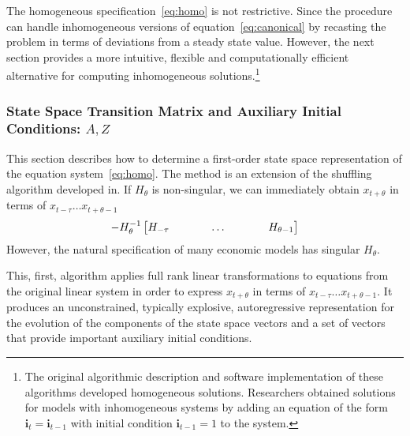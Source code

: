 \documentclass{elsart}
\begin{document}
The homogeneous specification~\ref{eq:homo} is not restrictive.
Since the procedure can handle 
inhomogeneous versions  of equation~\ref{eq:canonical}
by recasting the problem in terms of  deviations from a steady state value.
However,
the next section provides a  more intuitive, flexible 
and computationally efficient alternative for 
computing inhomogeneous solutions.\footnote{The original algorithmic description and
software implementation of these algorithms
developed homogeneous solutions.
Researchers obtained solutions for models with inhomogeneous systems
by adding an equation of the form $\mathbf{i}_{t} =  \mathbf{i}_{t-1}$ with initial condition 
$\mathbf{i}_{t-1}=1$ to 
the system.}









\subsubsection{State Space Transition Matrix and Auxiliary Initial Conditions: $A, Z$}
\label{sec:arzgev}

This section describes how to determine a first-order state space
representation of the equation system~\ref{eq:homo}. The method is an extension
of the shuffling algorithm developed in\cite{luenberger78,luenberger77}.
If $H_\theta$ is non-singular, we can immediately obtain $x_{t+\theta}$ 
in terms of $x_{t-\tau} \ldots x_{t+\theta-1}$
\begin{gather}
-  H_{\theta}^{-1}\begin{bmatrix}
    H_{-\tau}&\hspace{0.25in}&\dots&\hspace{0.25in}&H_{\theta-1}
  \end{bmatrix}  
\end{gather}
However, the natural specification of many economic models has singular
 $H_\theta$.

This, first,  algorithm
applies full rank linear transformations 
to equations from the original linear system in order to express
$x_{t+\theta}$ in terms of $x_{t-\tau} \ldots x_{t+\theta-1}$.
It produces an unconstrained, typically explosive, 
autoregressive representation for the evolution of the components of
the state space vectors and a set of vectors 
that provide important auxiliary initial conditions. 
\end{document}
